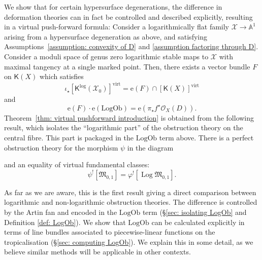 \documentclass[11pt]{amsart}
\theoremstyle{definition}
\newenvironment{customthm}[1]
  {\renewcommand\theinnercustomthm{#1}\innercustomthm}
  {\endinnercustomthm}
\theoremstyle{definition}
\newcommand{\op}[1]{\operatorname{#1}}
\newcommand{\e}{\mathrm{e}}
\newcommand{\Aaff}{\mathbb{A}}
\newcommand{\OO}{\mathcal{O}}
\newcommand{\virt}{\op{virt}}
\newcommand{\LogOb}{\mathrm{LogOb}}
\newcommand{\Xcal}{\mathcal{X}}
\newcommand{\Mfrak}{\mathfrak{M}}
\newcommand{\Kup}{\mathsf{K}}
\newcommand{\Log}{\operatorname{Log}}
\begin{document}
We show that for certain hypersurface degenerations, the difference in deformation theories can in fact be controlled and described explicitly, resulting in a virtual push-forward formula:
\begin{customthm}{B}[Theorem~\ref{thm: virtual pushforward}] \label{thm: virtual pushforward introduction} Consider a logarithmically flat family $\Xcal \to \Aaff^{\! 1}$ arising from a hypersurface degeneration as above, and satisfying Assumptions~\ref{assumption: convexity of D} and \ref{assumption factoring through D}. Consider a moduli space of genus zero logarithmic stable maps to $\Xcal$ with maximal tangency at a single marked point. Then, there exists a vector bundle $F$ on $\Kup(X)$ which satisfies
\begin{equation}\label{eqn: virtual pushforward introduction} \iota_\star [\Kup^{\log}(\Xcal_0)]^{\virt} = \e(F) \cap [\Kup(X)]^{\virt}\end{equation}
and 
\begin{equation*} \e(F) \cdot \e(\LogOb) = \e(\pi_\star f^\star \OO_{X}(D)).\end{equation*}
\end{customthm}
Theorem~\ref{thm: virtual pushforward introduction} is obtained from the following result, which isolates the ``logarithmic part'' of the obstruction theory on the central fibre. This part is packaged in the $\LogOb$ term above. 
\begin{customthm}{C}[Theorem~\ref{thm: isolating LogOb}] \label{thm: isolating LogOb introduction} There is a perfect obstruction theory for the morphism $\psi$ in the diagram
\begin{center}
\end{center}
and an equality of virtual fundamental classes:
\[ \psi^![\Mfrak_{0,1}] = \varphi^![\Log\Mfrak_{0,1}].\]


\end{customthm}
 As far as we are aware, this is the first result giving a direct comparison between logarithmic and non-logarithmic obstruction theories. The difference is controlled by the Artin fan and encoded in the $\LogOb$ term (\S \ref{sec: isolating LogOb} and Definition \ref{def: LogOb}). We show that $\LogOb$ can be calculated explicitly in terms of line bundles associated to piecewise-linear functions on the tropicalisation (\S \ref{sec: computing LogOb}). We explain this in some detail, as we believe similar methods will be applicable in other contexts.
\end{document}
